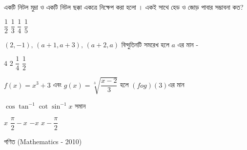 \documentclass[addpoints]{exam}
\begin{document}
\begin{questions}
\question একটি নিটল মুদ্রা ও একটি নিটল ছক্কা একত্রে  নিক্ষেপ করা হলো । একই সাথে হেড ও জোড় পাবার সম্ভাবনা কত?

\begin{oneparchoices}
\choice $ \dfrac{1}{2} $
\choice $ \dfrac{1}{3} $
\choice $ \dfrac{1}{4} $
\choice $ \dfrac{1}{5} $
\end{oneparchoices}

\question $ (2,-1),\,(a+1,a+3),\,(a+2, a) $  বিন্দুতিনটি সমরেখ হলে $ a $ এর মান -

\begin{oneparchoices}
\choice $ 4 $
\choice $ 2 $
\choice $ \dfrac{1}{4} $
\choice $ \dfrac{1}{2}$

\end{oneparchoices}

\question $ f(x) = x^{3}+3 $ এবং $ g(x) = \sqrt[3]{\dfrac{x-2}{3}} $ হলে $ (fog)(3) $এর মান


\begin{oneparchoices}

\end{oneparchoices}

\question  $ \cos\tan^{-1}\cot\sin^{-1}x $ সমান

\begin{oneparchoices}
\choice $ x $
\choice $ \dfrac{\pi}{2}-x $
\choice $ -x $
\choice $ x-\dfrac{\pi}{2} $
\end{oneparchoices}

\end{questions}
\begin{LARGE}
\begin{center}
গণিত (Mathematics - 2010)
\end{center}
\end{LARGE}
\end{document}

